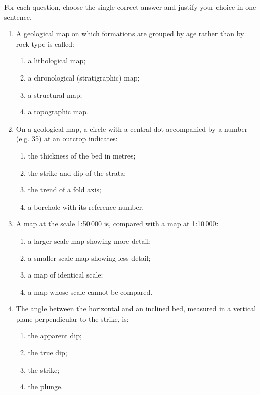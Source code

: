 \documentclass[11pt]{article}
\begin{document}
\begin{exercice}
For each question, choose the single correct answer and justify your choice in one sentence.
\begin{enumerate}
\item A geological map on which formations are grouped by age rather than by rock type is called:
\begin{enumerate}
\item a lithological map;
\item a chronological (stratigraphic) map;
\item a structural map;
\item a topographic map.
\end{enumerate}
\item On a geological map, a circle with a central dot accompanied by a number (e.g. 35) at an outcrop indicates:
\begin{enumerate}
\item the thickness of the bed in metres;
\item the strike and dip of the strata;
\item the trend of a fold axis;
\item a borehole with its reference number.
\end{enumerate}
\item A map at the scale 1:50\,000 is, compared with a map at 1:10\,000:
\begin{enumerate}
\item a larger-scale map showing more detail;
\item a smaller-scale map showing less detail;
\item a map of identical scale;
\item a map whose scale cannot be compared.
\end{enumerate}
\item The angle between the horizontal and an inclined bed, measured in a vertical plane perpendicular to the strike, is:
\begin{enumerate}
\item the apparent dip;
\item the true dip;
\item the strike;
\item the plunge.
\end{enumerate}
\end{enumerate}
\end{exercice}
\end{document}
